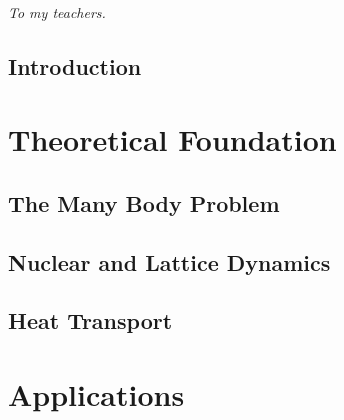 \documentclass[nobib,a4paper,twoside,notoc,justified,marginals=justified]{tufte-book}
\newcommand{\blankpage}{\newpage\hbox{}\thispagestyle{empty}\newpage}
\begin{document}
\frontmatter
{}
  
%  





\tableofcontents



\cleardoublepage
~\vfill
\begin{doublespace}
  \noindent\fontsize{12}{12}\selectfont\itshape
  \nohyphenation
  \thispagestyle{empty}
  \hfill To my teachers.
\end{doublespace}
\vfill
\vfill


\cleardoublepage

\chapter{Introduction}


\mainmatter
{}  %

\part{Theoretical Foundation}

\chapter{The Many Body Problem}


\chapter{Nuclear and Lattice Dynamics}


\chapter{Heat Transport}


\part{Applications}
\end{document}
